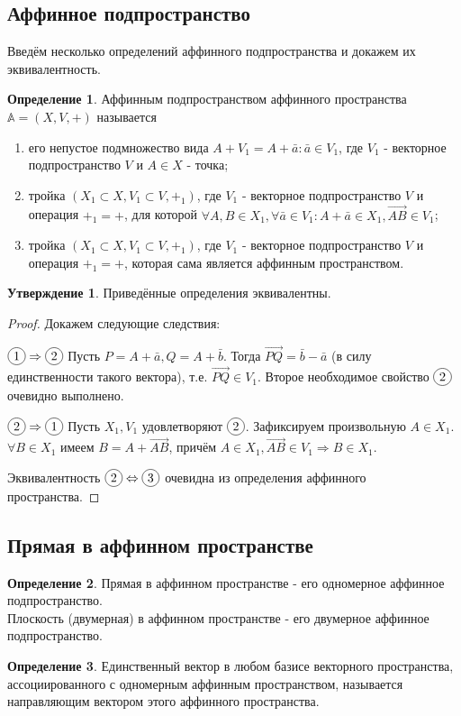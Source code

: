 \documentclass[a4paper, 12pt]{article}
\newcommand*\circled[1]{\tikz[baseline=(char.base)]{
            \node[shape=circle,draw,inner sep=2pt] (char) {#1};}}
\theoremstyle{definition}
\newtheorem*{definition}{Определение}
\newtheorem*{subtheorem}{Утверждение}
\begin{document}
	\subsection{Аффинное подпространство}
	Введём несколько определений аффинного подпространства и докажем их эквивалентность.
	\begin{definition}
		Аффинным подпространством аффинного пространства $\mathbb{A} = (X, V, +)$ называется
		\begin{enumerate}
			\item его непустое подмножество вида $A + V_{1} = {A + \bar{a}:\bar{a} \in V_{1}}$, где $V_{1}$ - векторное подпространство $V$ и $A \in X$ - точка;
			\item тройка $(X_{1}\subset X, V_{1} \subset V, +_{1})$, где $V_{1}$ - векторное подпространство $V$ и операция $+_{1} = +$,  для которой $\forall A,B \in X_{1}, \forall \bar{a} \in V_{1}: A + \bar{a} \in X_{1}, \overrightarrow{AB} \in V_{1}$;
			\item тройка $(X_{1}\subset X, V_{1} \subset V, +_{1})$, где $V_{1}$ - векторное подпространство $V$ и операция $+_{1} = +$,  которая сама является аффинным пространством.
		\end{enumerate}
	\end{definition}
	\begin{subtheorem}
		Приведённые определения эквивалентны.
	\end{subtheorem}
	\begin{proof}
		Докажем следующие следствия:

		$\circled{1}\Rightarrow\circled{2}$  Пусть $P = A + \bar{a}, Q = A + \bar{b}$. Тогда $\overrightarrow{PQ} = \bar{b} - \bar{a}$ (в силу единственности такого вектора), т.е. $\overrightarrow{PQ} \in V_{1}$. Второе необходимое свойство $\circled{2}$ очевидно выполнено.

		$\circled{2}\Rightarrow\circled{1}$  Пусть $X_{1}, V_{1}$ удовлетворяют $\circled{2}$. Зафиксируем произвольную $A \in X_{1}$. $\forall B\in X_{1}$ имеем $B = A + \overrightarrow{AB}$, причём $A \in X_{1}, \overrightarrow{AB} \in V_{1} \Rightarrow B \in X_{1}$.
		
		Эквивалентность $\circled{2}\Leftrightarrow\circled{3}$ очевидна из определения аффинного пространства.
	\end{proof}
	\subsection{Прямая в аффинном пространстве}
	\begin{definition}
		Прямая в аффинном пространстве - его одномерное аффинное подпространство. \\Плоскость (двумерная) в аффинном пространстве - его двумерное аффинное подпространство.
	\end{definition}
	\begin{definition}
		Единственный вектор в любом базисе векторного пространства, ассоциированного с одномерным аффинным пространством, называется направляющим вектором этого аффинного пространства.
	\end{definition}
\end{document}
